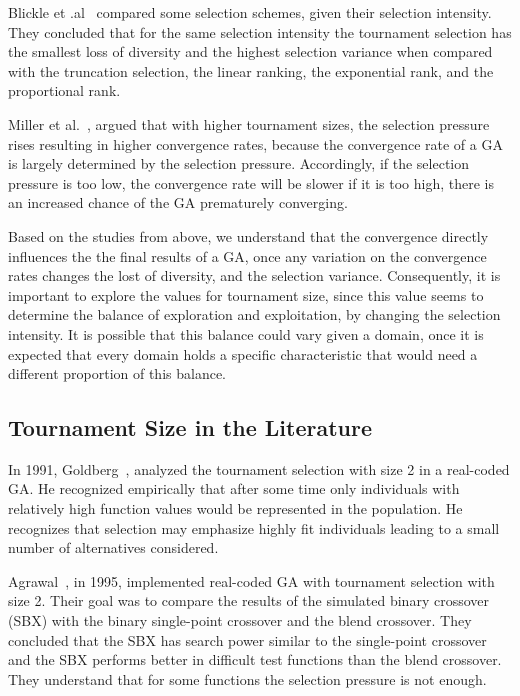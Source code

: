 Blickle et .al~\cite{blickle1995comparison} compared some selection schemes, given their selection intensity. They concluded that for the same selection intensity the tournament selection has the smallest loss of diversity and the highest selection variance when compared with the truncation selection, the linear ranking, the exponential rank, and the proportional rank.

Miller et al.~\cite{miller1995genetic}, argued that with higher tournament sizes, the selection pressure rises resulting in higher convergence rates, because the convergence rate of a GA is largely determined by the selection pressure.  Accordingly, if the selection pressure is too low, the convergence rate will be slower if it is too high, there is an increased chance of the GA prematurely converging.

Based on the studies from above, we understand that the convergence directly influences the the final results of a GA, once any variation on the convergence rates changes the lost of diversity, and the selection variance. Consequently, it is important to explore the values for tournament size, since this value seems to determine the balance of exploration and exploitation, by changing the selection intensity. It is possible that this balance could vary given a domain, once it is expected that every domain holds a specific characteristic that would need a different proportion of this balance.

\subsection{Tournament Size in the Literature}\label{sec:background:tournament_size} 

In 1991, Goldberg~\cite{goldberg1991real}, analyzed the tournament selection with size 2 in a real-coded GA. He recognized empirically that after some time only individuals with relatively high function values would be represented in the population. He recognizes that selection may emphasize highly fit individuals leading to a small number of alternatives considered.

Agrawal~\cite{agrawal1995simulated}, in 1995, implemented real-coded GA with tournament selection with size 2. Their goal was to compare the results of the simulated binary crossover (SBX) with the binary single-point crossover and the blend crossover. They concluded that the SBX has search power similar to the single-point crossover and the SBX performs better in difficult test functions than the blend crossover. They understand that for some functions the selection pressure is not enough.

